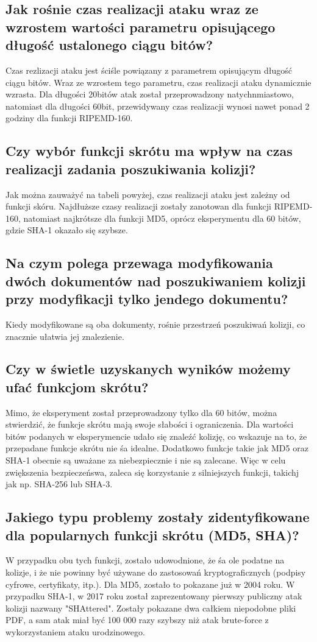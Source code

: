 \documentclass{article}
\begin{document}
\subsection{Jak rośnie czas realizacji ataku wraz ze wzrostem wartości parametru opisującego długość ustalonego ciągu bitów?}
Czas rezlizacji ataku jest ściśle powiązany z parametrem opisującym długość ciągu bitów. Wraz ze wzrostem tego parametru,
czas realizacji ataku dynamicznie wzrasta. Dla długości 20bitów atak został przeprowadzony natychnmiastowo, natomiast dla długości 60bit, przewidywany czas realizacji wynosi nawet ponad 2 godziny dla funkcji RIPEMD-160.
\subsection{Czy wybór funkcji skrótu ma wpływ na czas realizacji zadania poszukiwania kolizji?}
Jak można zauważyć na tabeli powyżej, czas realizacji ataku jest zależny od funkcji skóru. Najdłuższe czasy realizacji
zostały zanotowan dla funkcji RIPEMD-160, natomiast najkrótsze dla funkcji MD5, oprócz eksperymentu dla 60 bitów, gdzie SHA-1 okazało się szybsze.
\subsection{Na czym polega przewaga modyfikowania dwóch dokumentów nad poszukiwaniem kolizji przy modyfikacji tylko jendego dokumentu?}
Kiedy modyfikowane są oba dokumenty, rośnie przestrzeń poszukiwań kolizji, co znacznie ułatwia jej znalezienie.
\subsection{Czy w świetle uzyskanych wyników możemy ufać funkcjom skrótu?}
Mimo, że eksperyment został przeprowadzony tylko dla 60 bitów, można stwierdzić, że funkcje skrótu mają swoje słabości i ograniczenia. Dla wartości bitów podanych w eksperymencie
udało się znaleźć kolizję, co wskazuje na to, że przepadane funkcje skrótu nie śa idealne. Dodatkowo funkcje takie jak MD5 oraz SHA-1 obecnie są uważane za niebezpiecznie i nie są zalecane.
Więc w celu zwiększenia bezpieczeńswa, zaleca się korzystanie z silniejszych funkcji, takichj jak np. SHA-256 lub SHA-3.
\subsection{Jakiego typu problemy zostały zidentyfikowane dla popularnych funkcji skrótu (MD5, SHA)?}
W przypadku obu tych funkcji, zostało udowodnione, że śa ole podatne na kolizje, i że nie powinny być używane
do zastosowań kryptograficznych (podpisy cyfrowe, certyfikaty, itp.). Dla MD5, zostało to pokazane już w 2004 roku. W przypadku SHA-1, w 2017 roku został
zaprezentowany pierwszy publiczny atak kolizji nazwany "SHAttered". Zostały pokazane dwa całkiem niepodobne pliki PDF, a sam atak miał być 100 000 razy szybszy
niż atak brute-force z wykorzystaniem ataku urodzinowego.
\end{document}
